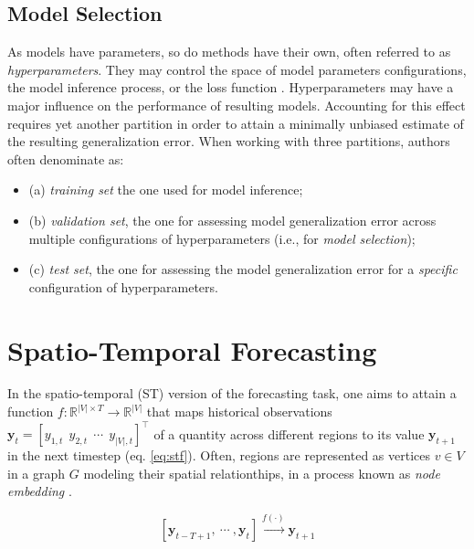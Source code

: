 \subsection{Model Selection}\label{subsec:modelselection}

As models have parameters, so do methods have their own, often referred to as \textit{hyperparameters}. They may control the space of model parameters configurations, the model inference process, or the loss function \cite{hutter2019automated}. Hyperparameters may have a major influence on the performance of resulting models. Accounting for this effect requires yet another partition in order to attain a minimally unbiased estimate of the resulting generalization error.
When working with three partitions, authors often denominate as:
\begin{itemize}
    \item (a) \textit{training set} the one used for model inference;
    \item (b) \textit{validation set}, the one for assessing model generalization error across multiple configurations of hyperparameters (i.e., for \textit{model selection});
    \item (c) \textit{test set}, the one for assessing the model generalization error for a \textit{specific} configuration of hyperparameters.
\end{itemize}

\pagebreak

\section{Spatio-Temporal Forecasting}\label{sec:stf}
In the spatio-temporal (ST) version of the forecasting task, one aims to attain a function $f: \mathbb{R}^{|V|\times T} \rightarrow \mathbb{R}^{|V|}$ that maps historical observations $\boldsymbol{y}_t = [y_{1,t}\  \  y_{2,t}\ \ \cdots \ \ y_{|V|,t}]^\top$ of a quantity across different regions to its value $\boldsymbol{y}_{t+1}$ in the next timestep  (eq. \ref{eq:stf}).
Often, regions are represented as vertices $v\in V$ in a graph $G$ modeling their spatial relationthips, in a process known as \textit{node embedding} \cite{liu2020intro}.

\begin{equation}\label{eq:stf}
    [\boldsymbol{y}_{t-T+1}, \  \cdots\ , \boldsymbol{y}_{t}] \xrightarrow{f(\cdot)} \boldsymbol{y}_{t+1}
\end{equation}

